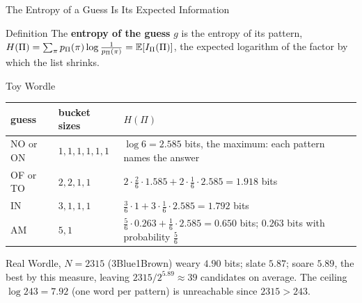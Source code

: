 \begin{frame}{The Entropy of a Guess Is Its Expected Information}
  \small
  \begin{block}{Definition}
    The \textbf{entropy of the guess} $g$ is the entropy of its pattern, $H(\Pi)=\sum_\pi p_\Pi(\pi)\log\frac1{p_\Pi(\pi)}=\mathbb{E}[I_\Pi(\Pi)]$, the expected logarithm of the factor by which the list shrinks.
  \end{block}
  \begin{exampleblock}{Toy Wordle}
    \begin{tabular}{@{}lll@{}}
      \toprule
      guess & bucket sizes & $H(\Pi)$ \\
      \midrule
      \textsf{NO} or \textsf{ON} & $1,1,1,1,1,1$ & $\log6=2.585$ bits, the maximum: each pattern names the answer \\
      \textsf{OF} or \textsf{TO} & $2,2,1,1$ & $2\cdot\tfrac26\cdot1.585+2\cdot\tfrac16\cdot2.585=1.918$ bits \\
      \textsf{IN} & $3,1,1,1$ & $\tfrac36\cdot1+3\cdot\tfrac16\cdot2.585=1.792$ bits \\
      \textsf{AM} & $5,1$ & $\tfrac56\cdot0.263+\tfrac16\cdot2.585=0.650$ bits; $0.263$ bits with probability $\tfrac56$ \\
      \bottomrule
    \end{tabular}
  \end{exampleblock}
  \begin{exampleblock}{Real Wordle, $N=2315$ (3Blue1Brown)}
    \textsf{weary} $4.90$ bits; \textsf{slate} $5.87$; \textsf{soare} $5.89$, the best by this measure, leaving $2315/2^{5.89}\approx39$ candidates on average. The ceiling $\log243=7.92$ (one word per pattern) is unreachable since $2315>243$.
  \end{exampleblock}
\end{frame}

